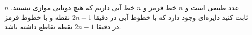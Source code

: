 $n$ عدد طبیعی است و $n$ خط قرمز و $n$ خط آبی داریم که هیچ دوتایی موازی نیستند.
ثابت کنید دایره‌ای وجود دارد که با خطوط آبی در دقیقا $2n - 1$ نقطه و با خطوط قرمز در دقیقا $2n - 1$ نقطه تقاطع داشته باشد.